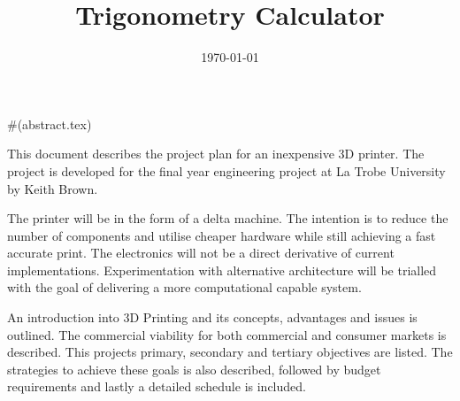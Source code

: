 \documentclass[a4paper, 11pt, oneside]{Thesis}  %
\begin{document}
\frontmatter      %
\title  {Trigonometry Calculator}
\addresses  {\groupname\\\deptname\\\univname}  %
\date       {\today}
\subject    {}
\keywords   {}

\maketitle





\fancyhead{}  %
\rhead{\thepage}  %
\lhead{}  %

\pagestyle{fancy}  %



#(abstract.tex){
This document describes the project plan for an inexpensive 3D printer. The project is developed for the final year engineering project at La Trobe University by Keith Brown.

The printer will be in the form of a delta machine. The intention is to reduce the number of components and utilise cheaper hardware while still achieving a fast accurate print. The electronics will not be a direct derivative of current implementations. Experimentation with alternative architecture will be trialled with the goal of delivering a more computational capable system.

An introduction into 3D Printing and its concepts, advantages and issues is outlined. The commercial viability for both commercial and consumer markets is described. This projects primary, secondary and tertiary objectives are listed. The strategies to achieve these goals is also described, followed by budget requirements and lastly a detailed schedule is included.
}
\end{document}
